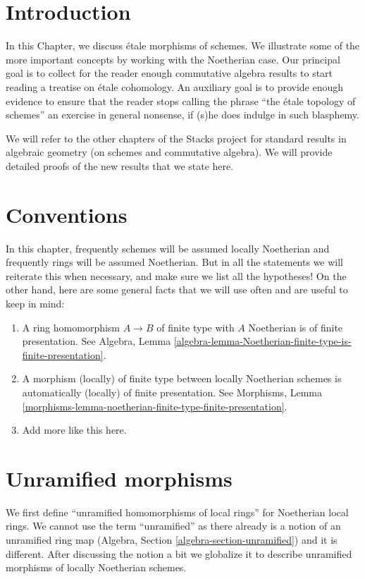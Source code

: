 \section{Introduction}
\label{etale-section-introduction}
In this Chapter, we discuss \'etale morphisms of schemes. We illustrate
some of the more important concepts by working with the Noetherian case.
Our principal goal is to collect for the reader enough commutative
algebra results to start reading a treatise on \'etale cohomology. An
auxiliary goal is to provide enough evidence to ensure that the reader stops
calling the phrase ``the \'etale topology of schemes'' an exercise in general
nonsense, if (s)he does indulge in such blasphemy.

\medskip\noindent
We will refer to the other
chapters of the Stacks project for standard results in algebraic geometry
(on schemes and commutative algebra). We will provide detailed
proofs of the new results that we state here.

\section{Conventions}
\label{etale-section-conventions}
In this chapter, frequently schemes will be assumed locally Noetherian
and frequently rings will be assumed Noetherian. But in all the statements
we will reiterate this when necessary, and make sure we list all the
hypotheses! On the other hand, here are some general facts that we will use
often and are useful to keep in mind:
\begin{enumerate}
\item A ring homomorphism $A \to B$ of finite type with $A$ Noetherian
is of finite presentation. See Algebra,
Lemma \ref{algebra-lemma-Noetherian-finite-type-is-finite-presentation}.
\item A morphism (locally) of finite type between locally Noetherian schemes
is automatically (locally) of finite presentation.
See Morphisms,
Lemma \ref{morphisms-lemma-noetherian-finite-type-finite-presentation}.
\item Add more like this here.
\end{enumerate}

\section{Unramified morphisms}
\label{etale-section-unramified-definition}
We first define ``unramified homomorphisms of local rings'' for Noetherian
local rings. We cannot use the term ``unramified'' as there already is
a notion of
an unramified ring map (Algebra, Section \ref{algebra-section-unramified})
and it is different. After discussing the notion a bit we
globalize it to describe unramified morphisms of locally Noetherian schemes.

